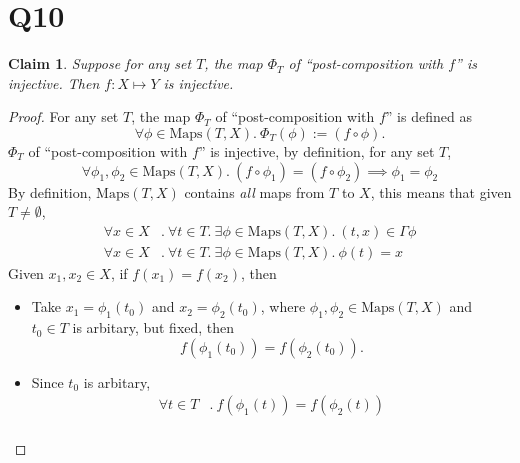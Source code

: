\documentclass[12pt]{article}
\newtheorem*{claim}{Claim}
\begin{document}
\section*{Q10}
\begin{claim}
    Suppose for any set $T$, the map $\Phi_T$ of ``post-composition with $f$'' is injective.
    Then $f: X \mapsto Y$ is injective.
\end{claim}
\begin{proof}
    For any set $T$, the map $\Phi_T$ of ``post-composition with $f$'' is defined as
    $$\forall \phi \in \text{Maps}(T, X).~ \Phi_T(\phi) := (f \circ \phi).$$
    $\Phi_T$ of ``post-composition with $f$'' is injective, by definition, for any set $T$,
    \begin{equation*}
        \forall \phi_1,\phi_2 \in \text{Maps}(T, X).~ (f \circ \phi_1) = (f \circ \phi_2) \implies \phi_1 = \phi_2 \tag{1} \label{eq:q10e1}
    \end{equation*}
    By definition, $\text{Maps}(T,X)$ contains \emph{all} maps from $T$ to $X$, this means that
    given $T \not = \emptyset$,
    \begin{align*}
        \forall x \in X&.~ \forall t \in T.~\exists \phi \in \text{Maps}(T,X).~ (t,x) \in \Gamma\phi\\
        \forall x \in X&.~ \forall t \in T.~\exists \phi \in \text{Maps}(T,X).~ \phi(t) = x
    \end{align*}
    Given $x_1, x_2 \in X$, if $f(x_1) = f(x_2)$, then
    \begin{itemize}[label={}]
        \item Take $x_1 = \phi_1(t_0)$ and $x_2 = \phi_2(t_0)$,
            where $\phi_1, \phi_2 \in \text{Maps}(T, X)$ and $t_0 \in T$ is arbitary, but fixed, then
            $$f(\phi_1(t_0)) = f(\phi_2(t_0)).$$
        \item Since $t_0$ is arbitary,
            \begin{align*}
                \forall t \in T&.~f(\phi_1(t)) = f(\phi_2(t))\\

\end{align*}
\end{itemize}
\end{proof}
\end{document}

